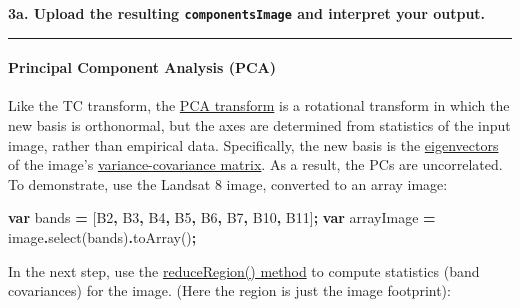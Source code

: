 \documentclass[
]{article}
\newenvironment{Shaded}{\begin{snugshade}}{\end{snugshade}}
\newcommand{\FunctionTok}[1]{\textcolor[rgb]{0.00,0.00,0.00}{#1}}
\newcommand{\KeywordTok}[1]{\textcolor[rgb]{0.13,0.29,0.53}{\textbf{#1}}}
\newcommand{\NormalTok}[1]{#1}
\newcommand{\OperatorTok}[1]{\textcolor[rgb]{0.81,0.36,0.00}{\textbf{#1}}}
\newcommand{\StringTok}[1]{\textcolor[rgb]{0.31,0.60,0.02}{#1}}
\begin{document}
\textbf{3a. Upload the resulting \texttt{componentsImage} and interpret your output.}

\begin{center}\rule{0.5\linewidth}{0.5pt}\end{center}

\hypertarget{principal-component-analysis-pca}{%
\paragraph{Principal Component Analysis (PCA)}\label{principal-component-analysis-pca}}

Like the TC transform, the \href{https://en.wikipedia.org/wiki/Principal_component_analysis}{PCA transform} is a rotational transform in which the new basis is orthonormal, but the axes are determined from statistics of the input image, rather than empirical data. Specifically, the new basis is the \href{https://en.wikipedia.org/wiki/Eigenvalues_and_eigenvectors}{eigenvectors} of the image's \href{https://en.wikipedia.org/wiki/Covariance_matrix}{variance-covariance matrix}. As a result, the PCs are uncorrelated. To demonstrate, use the Landsat 8 image, converted to an array image:

\begin{Shaded}
\begin{Highlighting}[]
\KeywordTok{var}\NormalTok{ bands }\OperatorTok{=}\NormalTok{ [}\StringTok{\textquotesingle{}B2\textquotesingle{}}\OperatorTok{,} \StringTok{\textquotesingle{}B3\textquotesingle{}}\OperatorTok{,} \StringTok{\textquotesingle{}B4\textquotesingle{}}\OperatorTok{,} \StringTok{\textquotesingle{}B5\textquotesingle{}}\OperatorTok{,} \StringTok{\textquotesingle{}B6\textquotesingle{}}\OperatorTok{,} \StringTok{\textquotesingle{}B7\textquotesingle{}}\OperatorTok{,} \StringTok{\textquotesingle{}B10\textquotesingle{}}\OperatorTok{,} \StringTok{\textquotesingle{}B11\textquotesingle{}}\NormalTok{]}\OperatorTok{;}
\KeywordTok{var}\NormalTok{ arrayImage }\OperatorTok{=}\NormalTok{  image}\OperatorTok{.}\FunctionTok{select}\NormalTok{(bands)}\OperatorTok{.}\FunctionTok{toArray}\NormalTok{()}\OperatorTok{;}  
\end{Highlighting}
\end{Shaded}

In the next step, use the \href{https://developers.google.com/earth-engine/reducers_reduce_region}{reduceRegion() method} to compute statistics (band covariances) for the image. (Here the region is just the image footprint):
\end{document}
